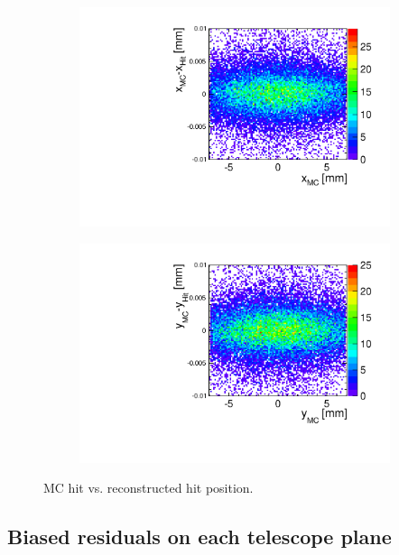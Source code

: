\begin{figure}[htbp] \centering
  \begin{subfigure}[b]{0.45\textwidth}
    \includegraphics[width=\textwidth]{figures/Telescope/telescopePlane0_MC_vs_hit_x_2D.pdf}
    \caption{}
  \end{subfigure}\hfill
  \begin{subfigure}[b]{0.45\textwidth}
    \includegraphics[width=\textwidth]{figures/Telescope/telescopePlane0_MC_vs_hit_y_2D.pdf}
    \caption{}
  \end{subfigure}
  \caption{MC hit vs. reconstructed hit position.}
  \label{fig:TelPlane0_MC_hit_2D}
\end{figure}



\subsection{Biased residuals on each telescope plane}

